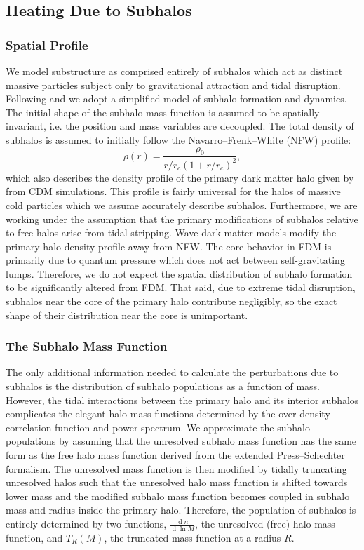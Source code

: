 \documentclass[usenatbib]{mnras}
\renewcommand{\d}[1]{\! \mathrm{d}#1 \:}
\renewcommand{\d}[1]{\ensuremath{\operatorname{d}\!{#1}}}
\begin{document}
\subsection{Heating Due to Subhalos}

\subsubsection{Spatial Profile}

We model substructure as comprised entirely of subhalos which act as distinct massive particles subject only to gravitational attraction and tidal disruption. Following \citet{tidal_limit} and \cite{unified_model} we adopt a
simplified model of subhalo
formation and dynamics. The initial shape of
the subhalo mass function is assumed to
be spatially invariant, i.e. the position
and mass variables are decoupled. The
total density of subhalos is assumed to initially
follow the Navarro--Frenk--White (NFW) profile:
\begin{equation}
\rho(r) = \frac{\rho_0}{r/r_c (1+r/r_c)^2},
\end{equation} which also
describes the density profile of the
primary dark matter halo given by \citet{structure} from CDM simulations. This profile is fairly universal for the halos of massive cold particles which we assume accurately describe subhalos. Furthermore, we are working under the assumption that the primary modifications of subhalos relative to free halos arise from tidal stripping. Wave dark matter models modify the primary halo density profile away from NFW. The core behavior in FDM is primarily due to quantum pressure which does not act between self-gravitating lumps. Therefore, we do not expect the spatial distribution of subhalo formation to be significantly altered from FDM. That said, due to extreme tidal disruption, subhalos near the core of the primary halo contribute negligibly, so the exact shape of their distribution near the core is unimportant.  

\subsubsection{The Subhalo Mass Function}

The only additional information needed to calculate the perturbations due to subhalos is the distribution of subhalo populations as a function of mass. However, the tidal interactions between the primary halo and its interior subhalos complicates the elegant halo mass functions determined by the over-density correlation function and power spectrum. We approximate the subhalo populations by assuming that the unresolved subhalo mass function has the same form as the free halo mass function derived from the extended Press--Schechter formalism. The unresolved mass function is then modified by tidally truncating unresolved halos such that the unresolved halo mass function is shifted towards lower mass and the modified subhalo mass function becomes coupled in subhalo mass and radius inside the primary halo. Therefore, the population of subhalos is entirely determined by two functions, $\frac{\d{n}}{\d{\ln{M}}}$, the unresolved (free) halo mass function, and $T_R(M)$, the truncated mass function at a radius $R$.
\end{document}
